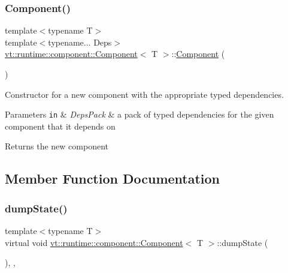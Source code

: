 \subsubsection{\texorpdfstring{Component()}{Component()}\hspace{0.1cm}{\footnotesize\ttfamily [2/2]}}
{\footnotesize\ttfamily template$<$typename T$>$ \\
template$<$typename... Deps$>$ \\
\hyperlink{structvt_1_1runtime_1_1component_1_1_component}{vt\+::runtime\+::component\+::\+Component}$<$ T $>$\+::\hyperlink{structvt_1_1runtime_1_1component_1_1_component}{Component} (\begin{DoxyParamCaption}\item[{\hyperlink{structvt_1_1runtime_1_1component_1_1_base_component_1_1_deps_pack}{Deps\+Pack}$<$ Deps... $>$}]{ }\end{DoxyParamCaption})\hspace{0.3cm}{\ttfamily [inline]}}



Constructor for a new component with the appropriate typed dependencies. 


\begin{DoxyParams}[1]{Parameters}
\mbox{\tt in}  & {\em Deps\+Pack} & a pack of typed dependencies for the given component that it depends on\\
\hline
\end{DoxyParams}
\begin{DoxyReturn}{Returns}
the new component 
\end{DoxyReturn}


\subsection{Member Function Documentation}
\mbox{\label{structvt_1_1runtime_1_1component_1_1_component_adaf8bd995d4c91702e2ff7806ad9e695}} 
\subsubsection{\texorpdfstring{dump\+State()}{dumpState()}}
{\footnotesize\ttfamily template$<$typename T$>$ \\
virtual void \hyperlink{structvt_1_1runtime_1_1component_1_1_component}{vt\+::runtime\+::component\+::\+Component}$<$ T $>$\+::dump\+State (\begin{DoxyParamCaption}{ }\end{DoxyParamCaption})\hspace{0.3cm}{\ttfamily [inline]}, {\ttfamily [override]}, {\ttfamily [virtual]}}



